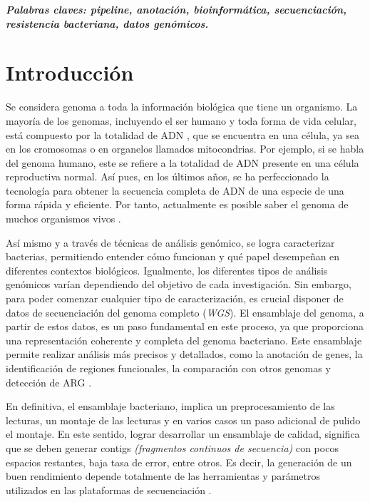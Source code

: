 \documentclass[12pt]{article}
\begin{document}
\vspace{10pt}
\textbf{\emph{Palabras claves: pipeline, anotación, bioinformática, secuenciación, resistencia bacteriana, datos genómicos.}}



\newpage
\section{Introducción}

Se considera genoma a toda la información biológica que tiene un organismo. 
La mayoría de los genomas, incluyendo el ser humano y toda forma de vida celular, 
está compuesto por la totalidad de ADN \cite{Arauco}, que se encuentra en una célula, 
ya sea en los cromosomas o en organelos llamados mitocondrias. Por ejemplo, 
si se habla del genoma humano, este se refiere a la totalidad de ADN presente en una 
célula reproductiva normal. Así pues, en los últimos años, se ha perfeccionado la 
tecnología para obtener la secuencia completa de ADN de una especie de una forma rápida 
y eficiente. Por tanto, actualmente es posible saber el genoma de muchos organismos 
vivos \cite{Arauco}.

Así mismo y a través de técnicas de análisis genómico, se logra caracterizar 
bacterias, permitiendo entender cómo funcionan y qué papel desempeñan en diferentes 
contextos biológicos. Igualmente, los diferentes tipos de análisis genómicos varían 
dependiendo del objetivo de cada investigación. Sin embargo, para poder comenzar 
cualquier tipo de caracterización, es crucial disponer de datos de secuenciación del
genoma completo (\emph{WGS}). El ensamblaje del genoma, a partir de estos datos, es un paso 
fundamental en este proceso, ya que proporciona una representación coherente y completa 
del genoma bacteriano. Este ensamblaje permite realizar análisis más precisos y 
detallados, como la anotación de genes, la identificación de regiones funcionales, la 
comparación con otros genomas y detección de ARG \cite{Lee}.

En definitiva, el ensamblaje bacteriano, implica un preprocesamiento de las 
lecturas, un montaje de las lecturas y en varios casos un paso adicional de pulido el 
montaje. En este sentido, lograr desarrollar un ensamblaje de calidad, significa que 
se deben generar contigs \emph{(fragmentos continuos de secuencia)} con pocos espacios restantes, 
baja tasa de error, entre otros. Es decir, la generación de un buen rendimiento depende 
totalmente de las herramientas y parámetros utilizados en las plataformas de 
secuenciación \cite{Lee}. 
\end{document}
